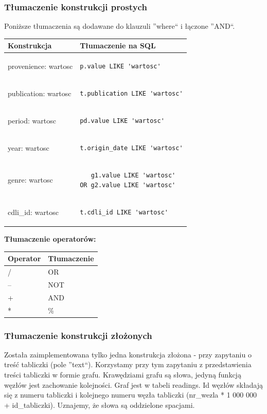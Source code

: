 \documentclass{pracamgr}
\begin{document}
\subsubsection{Tłumaczenie konstrukcji prostych}
Poniższe tłumaczenia są dodawane do klauzuli ''where`` i łączone ''AND``.
\begin{longtable}{|p{3in}|p{3in}|}
\hline
{\bf Konstrukcja} & {\bf Tłumaczenie na SQL}\\
\hline
\endhead
provenience: wartosc & \begin{verbatim}p.value LIKE 'wartosc'\end{verbatim}
\\
\hline
publication: wartosc & 
\begin{verbatim}
t.publication LIKE 'wartosc'
\end{verbatim}
\\
\hline
period: wartosc & 
\begin{verbatim}
pd.value LIKE 'wartosc'
\end{verbatim}
\\
\hline
year: wartosc & 
\begin{verbatim}
t.origin_date LIKE 'wartosc'
\end{verbatim}
\\
\hline
genre: wartosc & 
\begin{verbatim}
   g1.value LIKE 'wartosc' 
OR g2.value LIKE 'wartosc'
\end{verbatim}
\\
\hline
cdli\_id: wartosc & 
\begin{verbatim}
t.cdli_id LIKE 'wartosc'
\end{verbatim}
\\
\hline
\end{longtable}

\textbf{Tłumaczenie operatorów:}
\begin{longtable}{|p{1in}|p{1in}|}
\hline
{\bf Operator} & {\bf Tłumaczenie}\\
\hline
\endhead
/ & OR\\ 
\hline
-- & NOT\\ 
\hline
+ & AND\\ 
\hline
* & \%  \\ 
\hline
\end{longtable}


\subsubsection{Tłumaczenie konstrukcji złożonych}
Została zaimplementowana tylko jedna konstrukcja złożona - przy zapytaniu o treść tabliczki (pole ''text``).
Korzystamy przy tym zapytaniu z przedstawienia treści tabliczki w formie grafu. 
Krawędziami grafu są słowa, jedyną funkcją węzłów jest zachowanie kolejności. 
Graf jest w tabeli readings.
Id węzłów składają się z numeru tabliczki i kolejnego numeru węzła tabliczki (nr\_wezla * 1 000 000 + id\_tabliczki). 
Uznajemy, że słowa są oddzielone spacjami.
\end{document}
